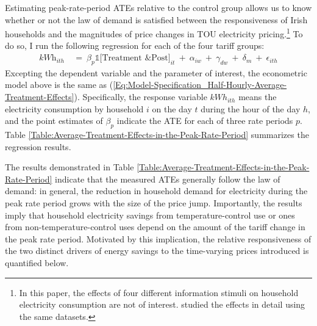 Estimating peak-rate-period ATEs relative to the control group allows us to know whether or not the law of demand is satisfied between the responsiveness of Irish households and the magnitudes of price changes in TOU electricity pricing.\footnote{In this paper, the effects of four different information stimuli on household electricity consumption are not of interest. \cite{The-Effect-of-Information-on-TOU-Electricity-Use:An-Irish-Residential-Study} studied the effects in detail using the same datasets.} To do so, I run the following regression for each of the four tariff groups:
\begin{equation}
\begin{split}
    \textit{kWh}_{ith} \ 
    & = \ \beta_{p} \mathbb{1}\big[ \text{Treatment \& Post} \big]_{it} \ + \ \alpha_{iw} \ + \ \gamma_{dw} \ + \ \delta_{m} \ + \ \epsilon_{ith}
\end{split}
\label{Eq:Model-Specification_Hourly-Average-Treatment-Effects}
\end{equation}
Excepting the dependent variable and the parameter of interest, the econometric model above is the same as (\ref{Eq:Model-Specification_Half-Hourly-Average-Treatment-Effects}). Specifically, the response variable $kWh_{ith}$ means the electricity consumption by household $i$ on the day $t$ during the hour of the day $h$, and the point estimates of $\beta_{p}$ indicate the ATE for each of three rate periods $p$. Table \ref{Table:Average-Treatment-Effects-in-the-Peak-Rate-Period} summarizes the regression results. 

The results demonstrated in Table \ref{Table:Average-Treatment-Effects-in-the-Peak-Rate-Period} indicate that the measured ATEs generally follow the law of demand: in general, the reduction in household demand for electricity during the peak rate period grows with the size of the price jump. Importantly, the results imply that household electricity savings from temperature-control use or ones from non-temperature-control uses depend on the amount of the tariff change in the peak rate period. Motivated by this implication, the relative responsiveness of the two distinct drivers of energy savings to the time-varying prices introduced is quantified below.


